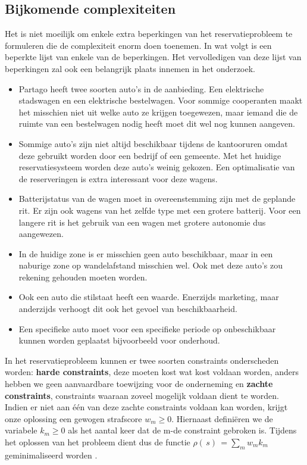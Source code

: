 \subsection{Bijkomende complexiteiten}
Het is niet moeilijk om enkele extra beperkingen van het reservatieprobleem te formuleren die de complexiteit enorm doen toenemen. In wat volgt is een beperkte lijst van enkele van de beperkingen. Het vervolledigen van deze lijst van beperkingen zal ook een belangrijk plaats innemen in het onderzoek.
\begin{itemize}
	\item Partago heeft twee soorten auto's in de aanbieding. Een elektrische stadswagen en een elektrische bestelwagen. Voor sommige cooperanten maakt het misschien niet uit welke auto ze krijgen toegewezen, maar iemand die de ruimte van een bestelwagen nodig heeft moet dit wel nog kunnen aangeven.
	\item Sommige auto's zijn niet altijd beschikbaar tijdens de kantooruren omdat deze gebruikt worden door een bedrijf of een gemeente. Met het huidige reservatiesysteem worden deze auto's weinig gekozen. Een optimalisatie van de reserveringen is extra interessant voor deze wagens.
	\item Batterijstatus van de wagen moet in overeenstemming zijn met de geplande rit. Er zijn ook wagens van het zelfde type met een grotere batterij. Voor een langere rit is het gebruik van een wagen met grotere autonomie dus aangewezen.
	\item In de huidige zone is er misschien geen auto beschikbaar, maar in een naburige zone op wandelafstand misschien wel. Ook met deze auto's zou rekening gehouden moeten worden.
	\item Ook een auto die stilstaat heeft een waarde. Enerzijds marketing, maar anderzijds verhoogt dit ook het gevoel van beschikbaarheid. 
	\item Een specifieke auto moet voor een specifieke periode op onbeschikbaar kunnen worden geplaatst bijvoorbeeld voor onderhoud.
\end{itemize}

In het reservatieprobleem kunnen er twee soorten constraints onderscheden worden: \textbf{harde constraints}, deze moeten kost wat kost voldaan worden, anders hebben we geen aanvaardbare toewijzing voor de onderneming en \textbf{zachte constraints}, constraints waaraan zoveel mogelijk voldaan dient te worden. Indien er niet aan één van deze zachte constraints voldaan kan worden, krijgt onze oplossing een gewogen strafscore $w_{m} \geq 0$. Hiernaast definiëren we de variabele $k_{m} \geq 0$ als het aantal keer dat de m-de constraint gebroken is. Tijdens het oplossen van het probleem dient dus de functie $\rho(\,s)\,=\sum\limits_{m} w_{m}k_{m}$ geminimaliseerd worden \autocite{santos}.  


